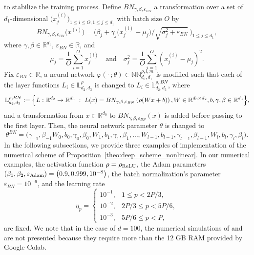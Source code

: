\documentclass[12pt]{article}
\numberwithin{equation}{section}
\newcommand{\real}{\mathbb{R}}
\let\oldcitet=\citet
\renewcommand{\cite}[1]{\textcolor[rgb]{0,0,1}{\oldcitet{#1}}}
\renewcommand{\citet}[1]{\textcolor[rgb]{0,0,1}{\oldcitet{#1}}}
\begin{document}
    to stabilize the training process.
    Define $BN_{\gamma,\beta,\varepsilon_{BN}}$ a transformation over
    a set of $d_1$-dimensional $\big(x^{(i)}_j\big)_{1 \leq i \leq O, 1 \leq j \leq d_1}$
    with batch size $O$
    by
    \begin{equation}
        BN_{\gamma,\beta,\varepsilon_{BN}}\big(x^{(i)}\big) =
        \Big( \beta_j + \gamma_j \big(x^{(i)}_j - \mu_j\big) \big/
            \sqrt{\sigma_j^2 + \varepsilon_{BN}} \ \Big)_{1 \leq j \leq d_1} ,
    \end{equation}
    where
    $\gamma , \beta \in \real^{d_1}$, $\varepsilon_{BN} \in \real$,
    and
    $$
    \mu_j = \frac{1}{O} \sum\limits_{i=1}^O x^{(i)}_j
    \quad \mbox{and} \quad
    \sigma_j^2 = \frac{1}{O} \sum\limits_{i=1}^O (x^{(i)}_j - \mu_j)^2.
    $$
    Fix $\varepsilon_{BN} \in \real$, a neural network
    $\varphi( \cdot \ ; \theta ) \in \mathbb{NN}^{\rho,l ,m}_{d_0, d_1}$
    is modified such that each of the layer functions
    $L_i \in \mathbb{L}^\rho_{d_2,d_3}$ is changed to
    $L_i \in \mathbb{L}^{\rho,BN}_{d_2,d_3}$, where
    \begin{equation*}
        \mathbb{L}^{\rho,BN}_{d_2,d_3} :=
        \Bigl\{
            L:\real^{d_2} \to \real^{d_3} \ : \ L(x) =
            BN_{\gamma,\beta,\varepsilon_{BN}}\left( \rho(W x + b) \right),
            W \in \real^{d_3 \times d_2},
            b, \gamma, \beta \in \real^{d_3}
        \Bigr\},
    \end{equation*}
    and a transformation from
    $x \in \real^{d_0}$ to $BN_{\gamma,\beta,\varepsilon_{BN}}(x)$
    is added before passing to the first layer.
    Then, the neural network parameter $\theta$ is changed to
    \begin{equation*}
        \theta^{BN} = \bigl( \gamma_{-1}, \beta_{-1}W_0, b_0, \gamma_0, \beta_0,
            W_1, b_1, \gamma_1, \beta_1, \dots,
            W_{l -1}, b_{l -1}, \gamma_{l -1}, \beta_{l -1},
            W_l , b_l , \gamma_l , \beta_l  \bigr).
    \end{equation*}
In the following subsections, we provide
three examples of implementation of
the numerical scheme of Proposition~\ref{theo:deep_scheme_nonlinear}.
In our numerical examples, the activation function $\rho = \rho_{\rm ReLU}$,
the Adam parameters
$\left(\beta_1, \beta_2,\varepsilon_{\rm Adam}\right)
= \left(0.9, 0.999,10^{-8}\right)$,
the batch normalization's parameter
$\varepsilon_{BN} = 10^{-6}$,
and the learning rate
\begin{equation*}
    \eta_p =
    \begin{cases}
        10^{-1},   &1    \leq p < 2P/3,
        \\
        10^{-2},   &2P/3 \leq p < 5P/6,
        \\
        10^{-3},   &5P/6 \leq p < P,
    \end{cases}
\end{equation*}
are fixed.
We note that in the case of $d=100$,
the numerical simulations of \cite{saporito2020pdgm} and \cite{sabate2020solving}
are not presented because they require more than the 12 GB RAM provided by Google Colab.
\end{document}

